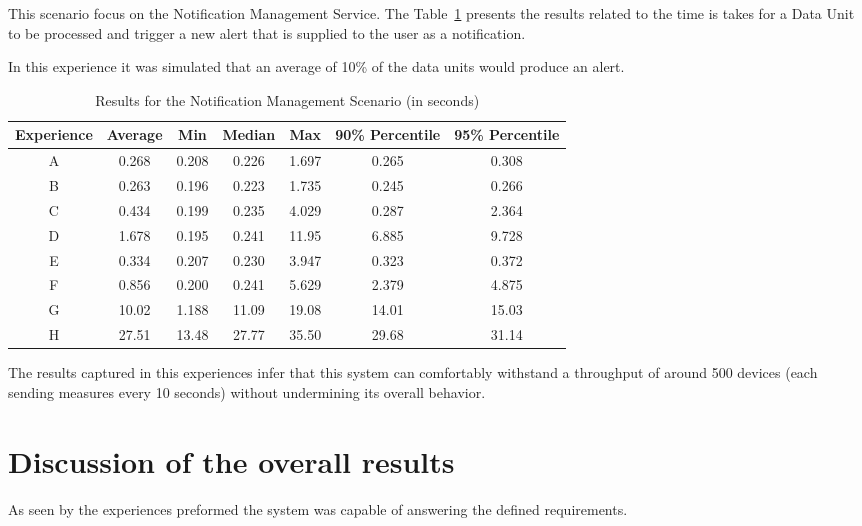 This scenario focus on the Notification Management Service. The Table~\ref{tab:evaluation:experiences:notification:results} presents the results related to the time is takes for a Data Unit to be processed and trigger a new alert that is  supplied to the user as a notification.

In this experience it was simulated that an average of 10\% of the data units would produce an alert.

\begin{table}[H]
    \caption{Results for the Notification Management Scenario (in seconds)}
    \label{tab:evaluation:experiences:notification:results}
    \centering
    \begin{tabular}{@{}ccccccc@{}}
    \toprule
    \textbf{Experience} & \textbf{Average} & \textbf{Min} & \textbf{Median} & \textbf{Max} & \textbf{90\% Percentile} & \textbf{95\% Percentile} \\ \midrule
    A & 0.268 & 0.208 & 0.226 & 1.697 & 0.265 & 0.308 \\ \midrule
    B & 0.263 & 0.196 & 0.223 & 1.735 & 0.245 & 0.266 \\ \midrule
    C & 0.434 & 0.199 & 0.235 & 4.029 & 0.287 & 2.364 \\ \midrule
    D & 1.678 & 0.195 & 0.241 & 11.95 & 6.885 & 9.728 \\ \midrule
    E & 0.334 & 0.207 & 0.230 & 3.947 & 0.323 & 0.372 \\ \midrule
    F & 0.856 & 0.200 & 0.241 & 5.629 & 2.379 & 4.875 \\ \midrule
    G & 10.02 & 1.188 & 11.09 & 19.08 & 14.01 & 15.03 \\ \midrule
    H & 27.51 & 13.48 & 27.77 & 35.50 & 29.68 & 31.14 \\ \bottomrule
    \end{tabular}
\end{table}

The results captured in this experiences infer that this system can comfortably withstand a throughput of around 500 devices (each sending measures every 10 seconds) without undermining its overall behavior.

\section{Discussion of the overall results}
\label{subsubsec:evaluation:overview}

As seen by the experiences preformed the system was capable of answering the defined requirements.

